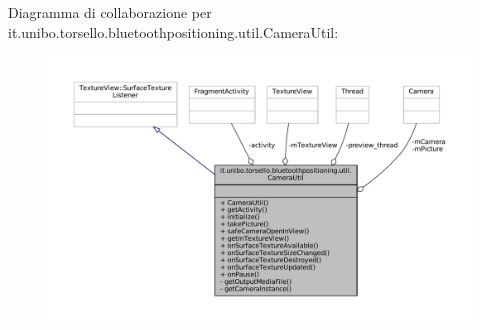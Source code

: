 Diagramma di collaborazione per it.\+unibo.\+torsello.\+bluetoothpositioning.\+util.\+Camera\+Util\+:
\nopagebreak
\begin{figure}[H]
\begin{center}
\leavevmode
\includegraphics[width=350pt]{classit_1_1unibo_1_1torsello_1_1bluetoothpositioning_1_1util_1_1CameraUtil__coll__graph}
\end{center}
\end{figure}
